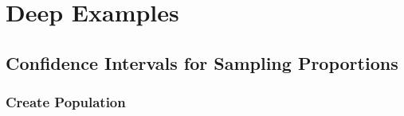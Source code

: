 \documentclass[float=false,crop=false]{standalone}
\begin{document}
    
    
    \maketitle
    
    

    
    \section{Deep Examples}\label{deep-examples}

\subsection{Confidence Intervals for Sampling
Proportions}\label{confidence-intervals-for-sampling-proportions}

\subsubsection{Create Population}\label{create-population}
\end{document}
